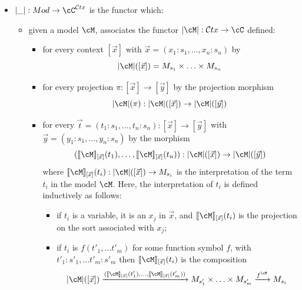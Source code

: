 \documentclass[preprint,3p,times]{elsarticle}
\def\sem#1{[\![ #1 ] \!]}
\newcommand{\Ctx}{\mathcal{C}tx}
\begin{document}
\begin{itemize}
\begin{itemize}
    
    \end{itemize}
    Since each \((\prod_I M_i)_s\) for \(s \in S\) is obtained as a small product in \(\cC\), it follows that $\prod_I \cM_i$ is the small product of $(\cM_i)_{i \in I}$.
    \item $|\_| : Mod \to \cC^{\Ctx}$ is the functor which:
    \begin{itemize}
        \item given a model $\cM$, associates the functor $|\cM| : \Ctx \to \cC$ defined:
        \begin{itemize}
            \item for every context $[\vec{x}]$ with $\vec{x} = (x_1:s_1,\ldots,x_n:s_n)$ by
            \[|\cM|([\vec{x}]) = M_{s_1} \times \ldots \times M_{s_n}\]
            \item for every projection $\pi : [\vec{x}] \to [\vec{y}]$ by the projection morphism
            \[|\cM|(\pi) : |\cM|([\vec{x}]) \to |\cM|([\vec{y}])\] 
            \item for every $\vec{t} = (t_1:s_1,\ldots,t_n:s_n) : [\vec{x}] \to [\vec{y}]$ with $\vec{y} = (y_1:s_1,\ldots,y_n:s_n)$ by the morphism
            \[(\sem{\cM}_{[\vec{x}]}(t_1),\ldots,\sem{\cM}_{[\vec{x}]}(t_n)) : |\cM|([\vec{x}]) \to |\cM|([\vec{y}])\] 
            where $\sem{\cM}_{[\vec{x}]}(t_i) : |\cM|([\vec{x}]) \to M_{s_i}$ is the interpretation of the term $t_i$ in the model $\cM$. Here, the interpretation of $t_i$ is defined inductively as follows:
            \begin{itemize}
                \item if \(t_i\) is a variable, it is an \(x_j\) in \(\vec{x}\), and \(\sem{\cM}_{[\vec{x}]}(t_i)\) is the projection on the sort associated with \(x_j\);
                \item if \(t_i\) is \(f(t'_1, \ldots t'_m)\) for some function symbol \(f\), with \(t'_1 : s'_1, \ldots t'_m:s'_m\) then \(\sem{\cM}_{[\vec{x}]}(t_i)\) is the composition
                \[|\cM|([\vec{x}]) \xrightarrow{(\sem{\cM}_{[\vec{x}]}(t'_1),\ldots,\sem{\cM}_{[\vec{x}]}(t'_m))} M_{s'_1} \times \ldots \times M_{s'_m} \xrightarrow{f^\cM} M_{s_i}\]
            \end{itemize}
        \end{itemize}
         

\end{itemize}
\end{itemize}
\end{document}
